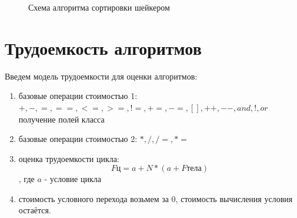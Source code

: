 \documentclass[12pt]{report}
\begin{document}
\newpage
\begin{figure}[H]
\caption{Схема алгоритма сортировки шейкером}
\label{ris:imageQS}
\end{figure}

\section{Трудоемкость алгоритмов}
Введем модель трудоемкости для оценки алгоритмов:
\begin{enumerate}
  	\item  базовые операции стоимостью 1: $ +, -, =, ==, <=, >=, !=, +=, -=, [], ++, --, and, !, or$ получение полей класса
  	\item  базовые операции стоимостью 2: $ *, /, /=, *=$
	\item оценка трудоемкости цикла: $$Fц = a + N*(a + Fтела)$$, где $a$ - условие цикла
	\item стоимость условного перехода возьмем за 0, стоимость вычисления условия остаётся.
\end{enumerate}
\end{document}
